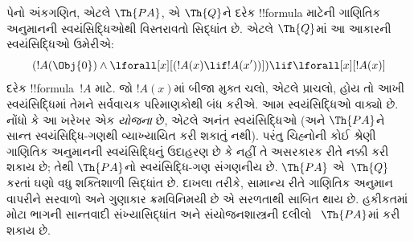\documentclass[../../../include/open-logic-section]{subfiles}
\begin{document}


પેનો અંકગણિત, એટલે
$\Th{PA}$, એ
$\Th{Q}$ને દરેક
!!{formula} માટેની
ગાણિતિક અનુમાનની
સ્વયંસિદ્ધિઓથી વિસ્તરાવતો
સિદ્ધાંત છે. એટલે
$\Th{Q}$માં આ આકારની
સ્વયંસિદ્ધિઓ ઉમેરીએ:
\[
(!A(\Obj{0}) \land \lforall[x][(!A(x) \lif !A(x'))]) \lif \lforall[x][!A(x)]
\]
દરેક !!{formula}~$!A$
માટે. જો $!A(x)$માં બીજા મુક્ત ચલો, એટલે પ્રાચલો,
હોય તો આખી સ્વયંસિદ્ધિમાં તેમને સર્વવાચક પરિમાણકોથી
બંધ કરીએ. આમ સ્વયંસિદ્ધિઓ વાક્યો છે.
નોંધો કે આ ખરેખર
એક \emph{યોજના} છે,
એટલે અનંત સ્વયંસિદ્ધિઓ
(અને $\Th{PA}$ને સાન્ત
સ્વયંસિદ્ધિ-ગણથી
વ્યાખ્યાયિત કરી શકાતું
નથી). પરંતુ ચિહ્નોની
કોઈ શ્રેણી ગાણિતિક
અનુમાનની સ્વયંસિદ્ધિનું
ઉદાહરણ છે કે નહીં તે
અસરકારક રીતે નક્કી કરી
શકાય છે; તેથી
$\Th{PA}$નો સ્વયંસિદ્ધિ-ગણ
સંગણનીય છે. $\Th{PA}$
એ~$\Th{Q}$ કરતાં ઘણો
વધુ શક્તિશાળી સિદ્ધાંત
છે. દાખલા તરીકે, સામાન્ય
રીતે ગાણિતિક અનુમાન
વાપરીને સરવાળો અને ગુણાકાર
ક્રમવિનિમયી છે એ સરળતાથી
સાબિત થાય છે. હકીકતમાં
મોટા ભાગની સાન્તવાદી
સંખ્યાસિદ્ધાંત અને
સંયોજનશાસ્ત્રની દલીલો
~$\Th{PA}$માં કરી શકાય છે.
\end{document}
